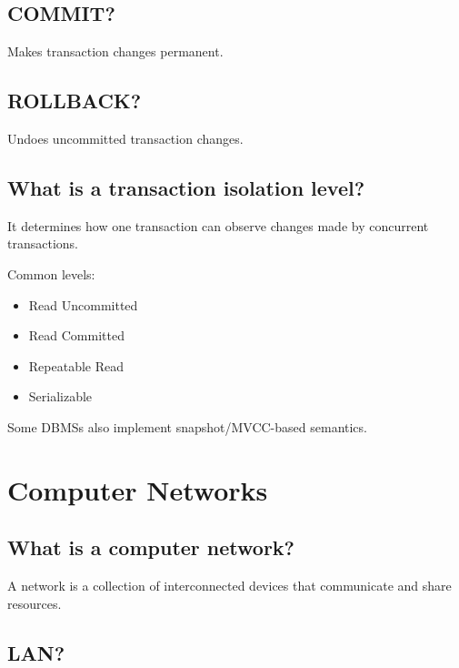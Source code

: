 \medskip

\subsection{COMMIT?}

Makes transaction changes permanent.

\medskip

\subsection{ROLLBACK?}

Undoes uncommitted transaction changes.

\medskip

\subsection{What is a transaction isolation level?}

It determines how one transaction can observe changes made by concurrent transactions.

Common levels:

\begin{itemize}
  \item Read Uncommitted
  \item Read Committed
  \item Repeatable Read
  \item Serializable
\end{itemize}

Some DBMSs also implement snapshot/MVCC-based semantics.

\medskip

\section{Computer Networks}

\subsection{What is a computer network?}

A network is a collection of interconnected devices that communicate and share resources.

\medskip

\subsection{LAN?}

